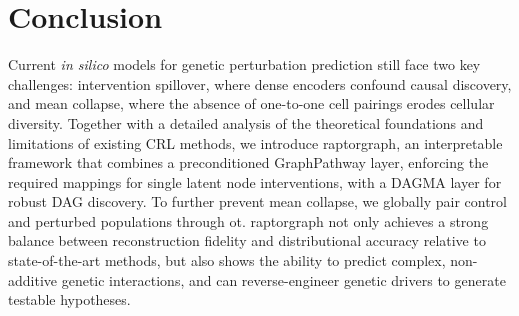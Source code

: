 \section{Conclusion}
\label{sec:conclusion}




Current \emph{in silico} models for genetic perturbation prediction still face two key challenges: intervention spillover, where dense encoders confound causal discovery, and mean collapse, where the absence of one-to-one cell pairings erodes cellular diversity. Together with a detailed analysis of the theoretical foundations and limitations of existing CRL methods, we introduce \gls{raptorgraph}, an interpretable framework that combines a preconditioned GraphPathway layer, enforcing the required mappings for single latent node interventions, with a DAGMA layer for robust DAG discovery.
To further prevent mean collapse, we globally pair control and perturbed populations through \gls{ot}.
\gls{raptorgraph} not only achieves a strong balance between reconstruction fidelity and distributional accuracy relative to state-of-the-art methods, but also shows the ability to predict complex, non-additive genetic interactions, and can reverse-engineer genetic drivers to generate testable hypotheses.


